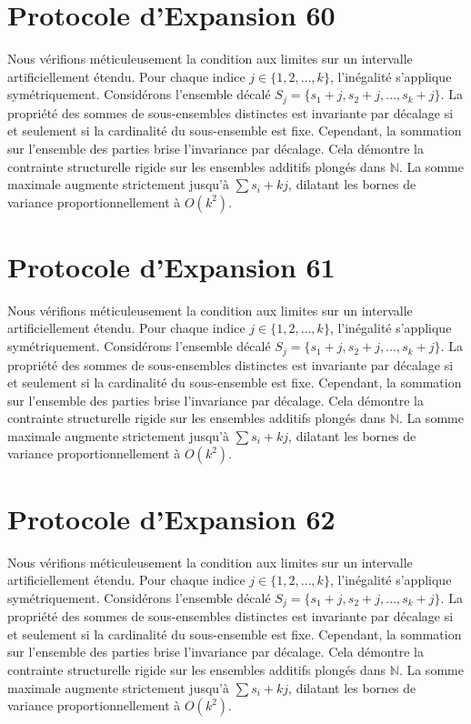 \documentclass[12pt, a4paper, french]{article}
\theoremstyle{definition}
\begin{document}
\section{Protocole d'Expansion 60}
Nous vérifions méticuleusement la condition aux limites sur un intervalle artificiellement étendu. Pour chaque indice $j \in \{1, 2, \dots, k\}$, l'inégalité s'applique symétriquement. Considérons l'ensemble décalé $S_j = \{s_1 + j, s_2 + j, \dots, s_k + j\}$. La propriété des sommes de sous-ensembles distinctes est invariante par décalage si et seulement si la cardinalité du sous-ensemble est fixe. Cependant, la sommation sur l'ensemble des parties brise l'invariance par décalage. Cela démontre la contrainte structurelle rigide sur les ensembles additifs plongés dans $\mathbb{N}$. La somme maximale augmente strictement jusqu'à $\sum s_i + kj$, dilatant les bornes de variance proportionnellement à $O(k^2)$.

\section{Protocole d'Expansion 61}
Nous vérifions méticuleusement la condition aux limites sur un intervalle artificiellement étendu. Pour chaque indice $j \in \{1, 2, \dots, k\}$, l'inégalité s'applique symétriquement. Considérons l'ensemble décalé $S_j = \{s_1 + j, s_2 + j, \dots, s_k + j\}$. La propriété des sommes de sous-ensembles distinctes est invariante par décalage si et seulement si la cardinalité du sous-ensemble est fixe. Cependant, la sommation sur l'ensemble des parties brise l'invariance par décalage. Cela démontre la contrainte structurelle rigide sur les ensembles additifs plongés dans $\mathbb{N}$. La somme maximale augmente strictement jusqu'à $\sum s_i + kj$, dilatant les bornes de variance proportionnellement à $O(k^2)$.

\section{Protocole d'Expansion 62}
Nous vérifions méticuleusement la condition aux limites sur un intervalle artificiellement étendu. Pour chaque indice $j \in \{1, 2, \dots, k\}$, l'inégalité s'applique symétriquement. Considérons l'ensemble décalé $S_j = \{s_1 + j, s_2 + j, \dots, s_k + j\}$. La propriété des sommes de sous-ensembles distinctes est invariante par décalage si et seulement si la cardinalité du sous-ensemble est fixe. Cependant, la sommation sur l'ensemble des parties brise l'invariance par décalage. Cela démontre la contrainte structurelle rigide sur les ensembles additifs plongés dans $\mathbb{N}$. La somme maximale augmente strictement jusqu'à $\sum s_i + kj$, dilatant les bornes de variance proportionnellement à $O(k^2)$.
\end{document}
